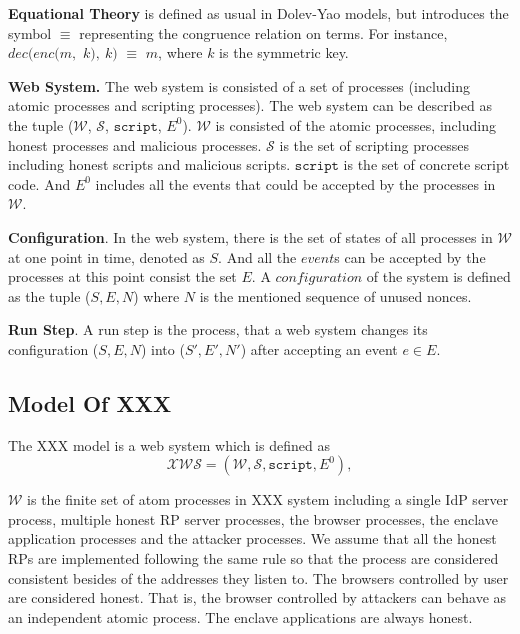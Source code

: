 \vspace{1mm}\noindent\textbf{Equational Theory } is defined as usual in Dolev-Yao models,  but introduces the symbol $\equiv$ representing the congruence relation on terms. For instance,  $dec(enc(m,$ $ k),\ k)$ $\equiv$ $m$, where $k$ is the symmetric key.

\vspace{1mm}\noindent\textbf{Web System. }
The web system is consisted of a set of processes (including atomic processes and scripting processes). The web system can be described as the tuple ($\mathcal{W}$, $\mathcal{S}$, $\mathtt{script}$, $E^0$). $\mathcal{W}$ is consisted of the atomic processes, including honest processes and malicious processes. $\mathcal{S}$ is the set of scripting processes including honest scripts and malicious scripts. $\mathtt{script}$ is the set of concrete script code. And $E^0$ includes all the events that could be accepted by the processes in $\mathcal{W}$. 

\vspace{1mm}\noindent\textbf{Configuration}. 
In the web system, there is the set of states of all processes in $\mathcal{W}$ at one point in time, denoted as $S$. 
And all the $event$s can be accepted by the processes at this point consist the set $E$.
A $configuration$ of the system is defined as the tuple ($S, E, N$) where $N$ is the mentioned sequence of unused nonces. 

\vspace{1mm}\noindent\textbf{Run Step}. A run step is the process, that a web system changes its configuration ($S, E, N$) into ($S', E', N'$) after accepting an event $e \in E$. 

\subsection{Model Of XXX}
The XXX model is a web system which is defined as 
\begin{equation*}
    \mathcal{XWS} = (\mathcal{W}, \mathcal{S}, \mathtt{script}, E^0),
\end{equation*}

$\mathcal{W}$ is the finite set of atom processes in XXX system including a single IdP server process, multiple honest RP server processes, the browser processes, the enclave application processes and the attacker processes. We assume that all the honest RPs are implemented following the same rule so that the process are considered consistent besides of the addresses they listen to. The browsers controlled by user are considered honest. That is, the browser controlled by attackers can behave as  an independent atomic process. The enclave applications are always honest.

